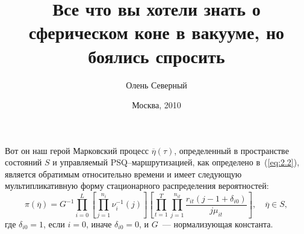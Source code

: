\title{Все что вы хотели знать о сферическом коне в вакууме, но боялись спросить}
\author{Олень Северный}
\date{Москва, 2010}
\frame{\titlepage}

\begin{frame}{Вот он наш герой}
 Марковский процесс $\overline{\eta}(\tau)$, определенный в пространстве состояний $S$ и управляемый PSQ--маршрутизацией, как определено в~(\ref{eq:2.2}), является обратимым относительно времени и имеет следующую мультипликативную форму стационарного распределения вероятностей:
 \begin{equation}
  \pi(\overline{\eta}) = G^{-1} \prod_{i=0}^L \left[ \prod_{j=1}^{n_i} \nu_i^{-1} (j) \right]
  \left[ \prod_{t=1}^T \prod_{j=1}^{n_{it}} \frac{r_{it} (j - 1 + \delta_{i0})}{j\mu_{it}} \right], \quad \overline{\eta} \in S ,
  \label{eq:2.4}
 \end{equation}
где $\delta_{i0}=1$, если $i=0$, иначе $\delta_{i0}=0$, и $G$~--- нормализующая константа.
\end{frame}
